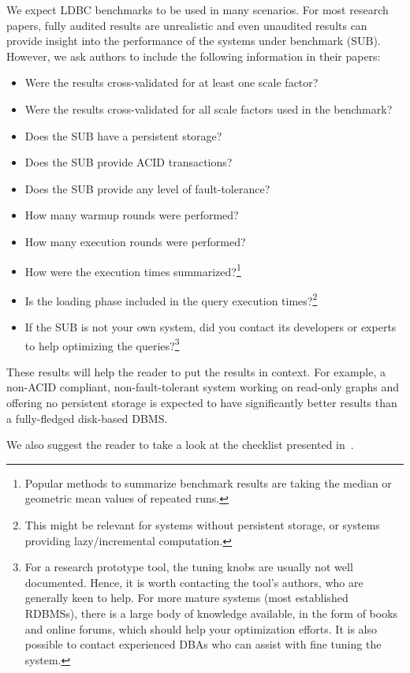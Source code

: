 We expect LDBC benchmarks to be used in many scenarios.
For most research papers, fully audited results are unrealistic and even unaudited results can provide insight into the performance of the systems under benchmark (SUB). However, we ask authors to include the following information in their papers:

\begin{itemize}
\item Were the results cross-validated for at least one scale factor?
\item Were the results cross-validated for all scale factors used in the benchmark?
\item Does the SUB have a persistent storage?
\item Does the SUB provide ACID transactions?
\item Does the SUB provide any level of fault-tolerance?
\item How many warmup rounds were performed?
\item How many execution rounds were performed?
\item How were the execution times summarized?\footnote{Popular methods to summarize benchmark results are taking the median or geometric mean values of repeated runs.}
\item Is the loading phase included in the query execution times?\footnote{This might be relevant for systems without persistent storage, or systems providing lazy/incremental computation.}
\item If the SUB is not your own system, did you contact its developers or experts to help optimizing the queries?\footnote{For a research prototype tool, the tuning knobs are usually not well documented. Hence, it is worth contacting the tool's authors, who are generally keen to help. For more mature systems (\eg most established RDBMSs), there is a large body of knowledge available, in the form of books and online forums, which should help your optimization efforts. It is also possible to contact experienced DBAs who can assist with fine tuning the system.}
\end{itemize}

These results will help the reader to put the results in context. For example, a non-ACID compliant, non-fault-tolerant system working on read-only graphs and offering no persistent storage is expected to have significantly better results than a fully-fledged disk-based DBMS.

We also suggest the reader to take a look at the checklist presented in~\cite{DBLP:conf/sigmod/RaasveldtHGM18}.
